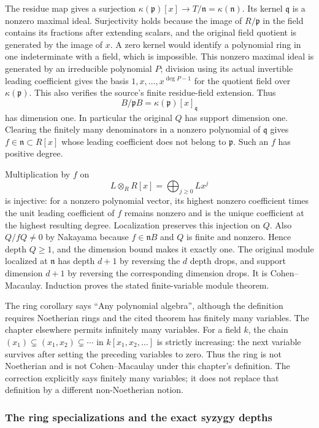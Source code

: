The residue map gives a surjection \(\kappa(\mathfrak p)[x]\to T/\mathfrak n=\kappa(\mathfrak n)\). Its kernel \(\mathfrak q\) is a nonzero maximal ideal. Surjectivity holds because the image of \(R/\mathfrak p\) in the field contains its fractions after extending scalars, and the original field quotient is generated by the image of \(x\). A zero kernel would identify a polynomial ring in one indeterminate with a field, which is impossible. This nonzero maximal ideal is generated by an irreducible polynomial \(P\); division using its actual invertible leading coefficient gives the basis \(1,x,\ldots,x^{\deg P-1}\) for the quotient field over \(\kappa(\mathfrak p)\). This also verifies the source's finite residue-field extension. Thus \[
 B/\mathfrak pB=\kappa(\mathfrak p)[x]_{\mathfrak q}
\] has dimension one. In particular the original \(Q\) has support dimension one. Clearing the finitely many denominators in a nonzero polynomial of \(\mathfrak q\) gives \(f\in\mathfrak n\subset R[x]\) whose leading coefficient does not belong to \(\mathfrak p\). Such an \(f\) has positive degree.

Multiplication by \(f\) on \[
 L\otimes_R R[x]=\bigoplus_{j\ge0}Lx^j
\] is injective: for a nonzero polynomial vector, its highest nonzero coefficient times the unit leading coefficient of \(f\) remains nonzero and is the unique coefficient at the highest resulting degree. Localization preserves this injection on \(Q\). Also \(Q/fQ\ne0\) by Nakayama because \(f\in\mathfrak nB\) and \(Q\) is finite and nonzero. Hence depth \(Q\ge1\), and the dimension bound makes it exactly one. The original module localized at \(\mathfrak n\) has depth \(d+1\) by reversing the \(d\) depth drops, and support dimension \(d+1\) by reversing the corresponding dimension drops. It is Cohen--Macaulay. Induction proves the stated finite-variable module theorem.

The ring corollary says ``Any polynomial algebra'', although the definition requires Noetherian rings and the cited theorem has finitely many variables. The chapter elsewhere permits infinitely many variables. For a field \(k\), the chain \((x_1)\subsetneq(x_1,x_2)\subsetneq\cdots\) in \(k[x_1,x_2,\ldots]\) is strictly increasing: the next variable survives after setting the preceding variables to zero. Thus the ring is not Noetherian and is not Cohen--Macaulay under this chapter's definition. The correction explicitly says finitely many variables; it does not replace that definition by a different non-Noetherian notion.

\subsubsection{The ring specializations and the exact syzygy depths}\label{the-ring-specializations-and-the-exact-syzygy-depths}

